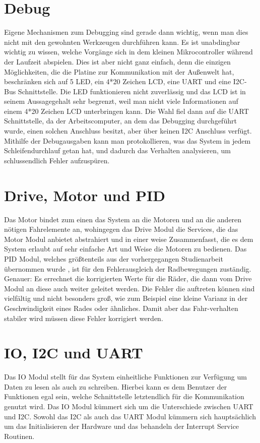 \section{Debug}
Eigene Mechanismen zum Debugging sind gerade dann wichtig, wenn man dies nicht mit den
gewohnten Werkzeugen durchführen kann.
Es ist unabdingbar wichtig zu wissen, welche Vorgänge sich in dem kleinen Mikrocontroller
während der Laufzeit abspielen.
Dies ist aber nicht ganz einfach, denn die einzigen Möglichkeiten, die die Platine zur
Kommunikation mit der Außenwelt hat, beschränken sich auf
5 LED, ein 4*20 Zeichen LCD, eine UART und eine I2C-Bus 
Schnittstelle.
Die LED funktionieren nicht zuverlässig und das LCD ist in seinem Aussagegehalt sehr
begrenzt, weil man nicht viele Informationen auf einem 4*20 Zeichen LCD unterbringen kann. 
Die Wahl fiel dann auf
die UART Schnittstelle, da der Arbeitscomputer, an dem das Debugging durchgeführt wurde,
einen solchen Anschluss besitzt, aber über keinen I2C Anschluss verfügt.
Mithilfe der Debugausgaben kann man protokollieren, was das System in jedem
Schleifendurchlauf getan hat, und dadurch das Verhalten analysieren, um schlussendlich
Fehler aufzuspüren. 
\section{Drive, Motor und PID}
Das Motor bindet zum einen das System an die Motoren und an die anderen nötigen
Fahrelemente an, wohingegen das Drive Modul die Services, die das Motor Modul anbietet
abstrahiert und in einer weise Zusammenfasst, die es dem System erlaubt auf sehr einfache
Art und Weise die Motoren zu bedienen.
Das PID Modul, welches größtenteils aus der vorhergegangen Studienarbeit übernommen wurde
\cite{STUD_TIMO}, ist für den Fehlerausgleich der Radbewegungen zuständig. Genauer: Es
errechnet die korrigierten Werte für die Räder, die dann vom Drive Modul an diese auch
weiter geleitet werden. Die Fehler die auftreten können sind vielfältig und nicht besonders
groß, wie zum Beispiel eine kleine Varianz in der Geschwindigkeit eines Rades oder ähnliches.
Damit aber das Fahr-verhalten stabiler wird müssen diese Fehler korrigiert werden.
\section{IO, I2C und UART}
Das IO Modul stellt für das System einheitliche Funktionen zur Verfügung um Daten zu lesen als
auch zu schreiben. Hierbei kann es dem Benutzer der Funktionen egal sein, welche Schnittstelle
letztendlich für die Kommunikation genutzt wird. Das IO Modul kümmert sich um die Unterschiede
zwischen UART und I2C.
Sowohl das I2C als auch das UART Modul kümmern sich hauptsächlich um das Initialisieren der
Hardware und das behandeln der Interrupt Service Routinen.
